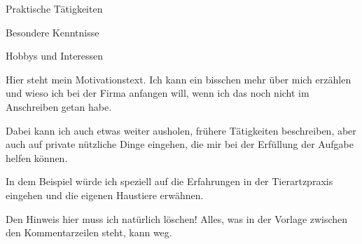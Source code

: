 \documentclass[fontsize=12pt,parskip=half-]{scrartcl}
\begin{document}
\begin{Lebenslauf}
\NeueSeiteAbschnittCV

\begin{AbschnittCV}{Praktische Tätigkeiten}%
\end{AbschnittCV}

\begin{AbschnittCV}{Besondere Kenntnisse}%
\end{AbschnittCV}

\begin{AbschnittCV}{Hobbys und Interessen}%
\end{AbschnittCV}

\end{Lebenslauf}


\begin{Motivation}
    Hier steht mein Motivationstext. Ich kann ein bisschen mehr
    über mich erzählen und wieso ich bei der Firma anfangen will,
    wenn ich das noch nicht im Anschreiben getan habe.
    
    Dabei kann ich auch etwas weiter ausholen, frühere Tätigkeiten
    beschreiben, aber auch auf private nützliche Dinge eingehen,
    die mir bei der Erfüllung der Aufgabe helfen können.
    
    In dem Beispiel würde ich speziell auf die Erfahrungen in der
    Tierartzpraxis eingehen und die eigenen Haustiere erwähnen.
    
    Den Hinweis hier muss ich natürlich löschen! Alles, was in der Vorlage
    zwischen den Kommentarzeilen steht, kann weg.
\end{Motivation}
\end{document}

